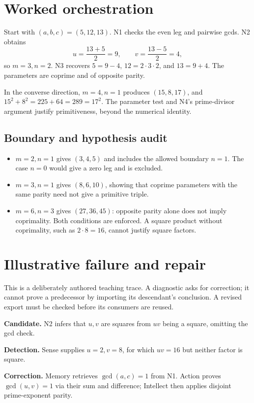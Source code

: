\documentclass[preprint,12pt,aps,pra,showkeys,amsmath,amssymb,superscriptaddress,floatfix]{revtex4-2}
\theoremstyle{definition}
\theoremstyle{remark}
\newcommand{\field}[2]{\par\smallskip\noindent\textbf{#1.} #2\par}
\begin{document}
\section{Worked orchestration}

Start with \((a,b,c)=(5,12,13)\). N1 checks the even leg and pairwise
gcds. N2 obtains \[u=\frac{13+5}{2}=9,\qquad v=\frac{13-5}{2}=4,\] so
\(m=3,n=2\). N3 recovers \(5=9-4\), \(12=2\cdot3\cdot2\), and
\(13=9+4\). The parameters are coprime and of opposite parity.

In the converse direction, \(m=4,n=1\) produces \((15,8,17)\), and
\(15^2+8^2=225+64=289=17^2\). The parameter test and N4's prime-divisor
argument justify primitiveness, beyond the numerical identity.

\subsection{Boundary and hypothesis audit}

\begin{itemize}
\item
  \(m=2,n=1\) gives \((3,4,5)\) and includes the allowed boundary
  \(n=1\). The case \(n=0\) would give a zero leg and is excluded.
\item
  \(m=3,n=1\) gives \((8,6,10)\), showing that coprime parameters with
  the same parity need not give a primitive triple.
\item
  \(m=6,n=3\) gives \((27,36,45)\): opposite parity alone does not imply
  coprimality. Both conditions are enforced. A square product without
  coprimality, such as \(2\cdot8=16\), cannot justify square factors.
\end{itemize}

\section{Illustrative failure and repair}

This is a deliberately authored teaching trace. A diagnostic asks for
correction; it cannot prove a predecessor by importing its descendant's
conclusion. A revised export must be checked before its consumers are
reused.

\field{Candidate}{N2 infers that \(u,v\) are squares from \(uv\) being a square, omitting
the gcd check.}

\field{Detection}{Sense supplies \(u=2,v=8\), for which \(uv=16\) but neither factor is
square.}

\field{Correction}{Memory retrieves \(\gcd(a,c)=1\) from N1. Action proves \(\gcd(u,v)=1\)
via their sum and difference; Intellect then applies disjoint
prime-exponent parity.}
\end{document}
